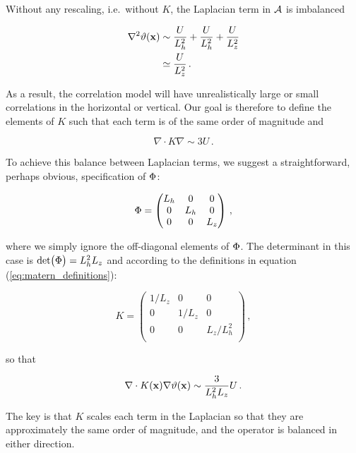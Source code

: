 Without any rescaling, i.e.\ without $K$,
the Laplacian term in $\mathcal{A}$ is imbalanced
\begin{linenomath*}\begin{equation}
    \begin{aligned}
        \nabla^2 \vartheta(\mathbf{x})
            & \sim \dfrac{U}{L_h^2} + \dfrac{U}{L_h^2} + \dfrac{U}{L_z^2} \\
            & \simeq \dfrac{U}{L_z^2} \, .
    \end{aligned}
    \label{eq:iso_lap}
\end{equation}\end{linenomath*}
As a result, the correlation model will
have unrealistically large or small correlations in the horizontal or vertical.
Our goal is therefore to define the elements of $K$ such that each term is of
the same order of magnitude and
\begin{linenomath*}\begin{equation*}
    \nabla\cdot K\nabla \sim 3U \, .
\end{equation*}\end{linenomath*}

To achieve this balance between Laplacian terms, we suggest a straightforward,
perhaps obvious, specification of $\Phi$:
\begin{linenomath*}\begin{equation*}
    \Phi =
        \begin{pmatrix}
            L_h & 0 & 0     \\
            0 & L_h & 0     \\
            0 & 0   & L_z   \\
        \end{pmatrix} \, ,
\end{equation*}\end{linenomath*}
where we simply ignore the off-diagonal elements of $\Phi$.
The determinant in this case is $\text{det}\big(\Phi\big) = L_h^2L_z$ and
according to the definitions in equation (\ref{eq:matern_definitions}):
\begin{linenomath*}\begin{equation*}
    K =
        \begin{pmatrix}
            1/L_z & 0 & 0     \\
            0 & 1/L_z & 0     \\
            0 & 0   & L_z/L_h^2   \\
        \end{pmatrix} \, ,
\end{equation*}\end{linenomath*}
so that
\begin{linenomath*}\begin{equation*}
    \nabla\cdot K(\mathbf{x})\nabla\vartheta(\mathbf{x}) \sim \dfrac{3}{L_h^2L_z}U \, .
\end{equation*}\end{linenomath*}
The key is that $K$ scales each term in the Laplacian so that they are
approximately the same order of magnitude, and the operator is balanced in either direction.\\

